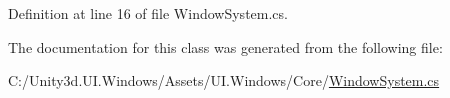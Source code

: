 Definition at line 16 of file Window\+System.\+cs.



The documentation for this class was generated from the following file\+:\begin{DoxyCompactItemize}
\item 
C\+:/\+Unity3d.\+U\+I.\+Windows/\+Assets/\+U\+I.\+Windows/\+Core/\hyperlink{_window_system_8cs}{Window\+System.\+cs}\end{DoxyCompactItemize}
